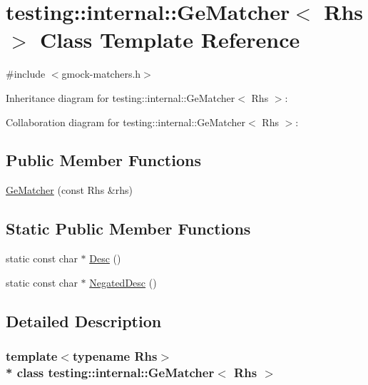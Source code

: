 \hypertarget{classtesting_1_1internal_1_1_ge_matcher}{}\section{testing\+:\+:internal\+:\+:Ge\+Matcher$<$ Rhs $>$ Class Template Reference}
\label{classtesting_1_1internal_1_1_ge_matcher}


{\ttfamily \#include $<$gmock-\/matchers.\+h$>$}



Inheritance diagram for testing\+:\+:internal\+:\+:Ge\+Matcher$<$ Rhs $>$\+:


Collaboration diagram for testing\+:\+:internal\+:\+:Ge\+Matcher$<$ Rhs $>$\+:
\subsection*{Public Member Functions}
\begin{DoxyCompactItemize}
\item 
\hyperlink{classtesting_1_1internal_1_1_ge_matcher_aba23cbb4040d08be1a9db09b73906182}{Ge\+Matcher} (const Rhs \&rhs)
\end{DoxyCompactItemize}
\subsection*{Static Public Member Functions}
\begin{DoxyCompactItemize}
\item 
static const char $\ast$ \hyperlink{classtesting_1_1internal_1_1_ge_matcher_a5676836bfa354f4398dd083621a05877}{Desc} ()
\item 
static const char $\ast$ \hyperlink{classtesting_1_1internal_1_1_ge_matcher_a028847a76dbf02b8da3d56ce448ef053}{Negated\+Desc} ()
\end{DoxyCompactItemize}


\subsection{Detailed Description}
\subsubsection*{template$<$typename Rhs$>$\\*
class testing\+::internal\+::\+Ge\+Matcher$<$ Rhs $>$}



